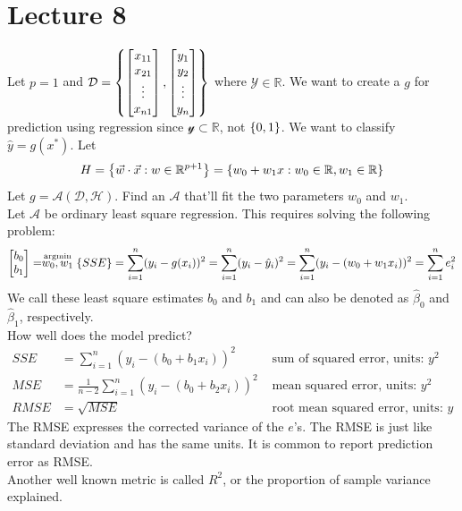 \documentclass[12pt]{article}
\begin{document}
\section{Lecture 8} 
Let $p = 1$ and $\mathcal{D} = \left\{ \begin{bmatrix} x_{11} \\ x_{21} \\ \vdots \\ x_{n1} \end{bmatrix}, \begin{bmatrix} y_1 \\ y_2 \\ \vdots \\ y_n \end{bmatrix} \right\}$ where $\mathcal{Y} \in \mathbb{R}$. We want to create a $g$ for prediction using regression since $\mathcal{y} \subset \mathbb{R}$, not $\left\{ 0,1 \right\}$. We want to classify $\hat{y} = g(x^*)$. Let 
$$H = \left\{  \vec{w} \cdot \vec{x}: w \in \mathbb{R}^{p+1} \right\} = \left\{ w_0 + w_1x: w_0 \in \mathbb{R}, w_1 \in \mathbb{R} \right\}$$ 
Let $g = \mathcal{A}(\mathcal{D},\mathcal{H})$. Find an $\mathcal{A}$ that'll fit the two parameters $w_0$ and $w_1$. \\
Let $\mathcal{A}$ be ordinary least square regression. This requires solving the following problem:
$$ \begin{bmatrix} b_0 \\ b_1 \end{bmatrix} = \stackrel{\text{argmin}}{w_0,w_1} \left\{ SSE \right\} = \sum_{i=1}^n (y_i - g(x_i))^2 = \sum_{i=1}^n (y_i - \hat{y}_i)^2 = \sum_{i=1}^n (y_i - (w_0 + w_1x_i))^2 = \sum_{i=1}^n e_i^2 $$ 
We call these least square estimates $b_0$ and $b_1$ and can also be denoted as $\hat{\beta}_0$ and $\hat{\beta}_1$, respectively. \\
How well does the model predict? 
$$ \begin{aligned} SSE &= \sum_{i = 1}^n (y_i - (b_0 + b_1x_i))^2 &\text{ sum of squared error, units: } y^2 \\ MSE &= \frac{1}{n-2}\sum_{i=1}^n (y_i - (b_0 + b_2x_i))^2 &\text{ mean squared error, units: } y^2 \\ RMSE &= \sqrt{MSE} &\text{ root mean squared error, units: } y \end{aligned} $$ 
The RMSE expresses the corrected variance of the $e$'s. The RMSE is just like standard deviation and has the same units. It is common to report prediction error as RMSE. \\
Another well known metric is called $R^2$, or the proportion of sample variance explained. \\
\end{document}

